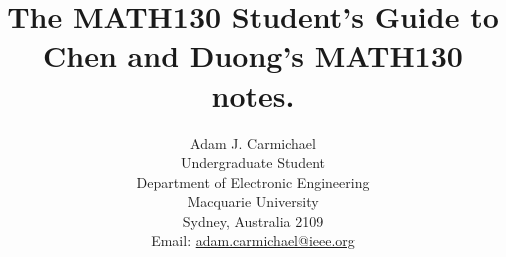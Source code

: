 \title{
  The MATH130 Student's Guide to Chen and Duong's MATH130 notes.
}
%
\author{
  Adam J. Carmichael \\
  Undergraduate Student \\
  Department of Electronic   Engineering\\
  Macquarie University\\
  Sydney, Australia 2109\\
  Email: \url{adam.carmichael@ieee.org} \\
}%
%

%
\maketitle
%


\tableofcontents

































%
